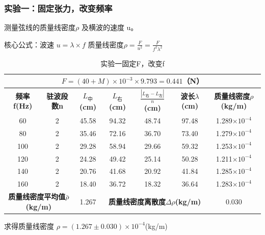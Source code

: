 \documentclass[]{../template/Report}%
\begin{document}
\begin{fullreportonly}
\subsubsection{实验一：固定张力，改变频率}
测量弦线的质量线密度$\rho$ 及横波的速度 u。
\par
核心公式：波速 $u = \lambda \times f$ \quad 质量线密度$\rho = \frac{F}{u^2} = \frac{F}{f^2\lambda^2}$
\par
\begin{table}[H]
    \centering
    \caption{实验一固定F，改变f}
    \begin{tabular}{|c|c|c|c|c|c|c|}
        \hline
        \multicolumn{7}{|c|}{$F = (40 + M) \times 10^{-3} \times 9.793 = 0.441$（N）}  \\
        \hline
        \textbf{频率f(Hz)} & \textbf{驻波段数n} & \textbf{$L_\text{中}$(cm)} & \textbf{$L_\textbf{右}$(cm)} & \textbf{$\frac{|L_\textbf{右} - L_\textbf{左}|}{n}$(cm)} & \textbf{波长$\lambda$(cm)} & \textbf{质量线密度$\rho$(kg/m)}  \\
        \hline
        60 & 2 & 45.58 & 94.32 & 48.74 & 97.48 & 1.289$\times 10^{-4}$  \\
        \hline
        80 & 2 & 35.46 & 72.16 & 36.70 & 73.40 & 1.279$\times 10^{-4}$  \\
        \hline
        100 & 2 & 29.28 & 58.94 & 29.66 & 59.32 & 1.253$\times 10^{-4}$  \\
        \hline
        120 & 2 & 24.28 & 49.42 & 25.14 & 50.28 & 1.211$\times 10^{-4}$  \\
        \hline
        140 & 2 & 20.76 & 41.68 & 20.92 & 41.84 & 1.285$\times 10^{-4}$  \\
        \hline
        160 & 2 & 18.40 & 36.72 & 18.32 & 36.64 & 1.283$\times 10^{-4}$  \\
        \hline
        \multicolumn{2}{|c|}{\textbf{质量线密度平均值$\bar \rho$(kg/m)}} & 1.267 &
        \multicolumn{3}{|c|}{\textbf{质量线密度离散度$\Delta \rho$(kg/m)}} & 0.030  \\
        \hline
    \end{tabular}
\end{table}
求得质量线密度 $\rho = (1.267 \pm 0.030) \times 10^{-4}$(kg/m)


\end{fullreportonly}
\end{document}
